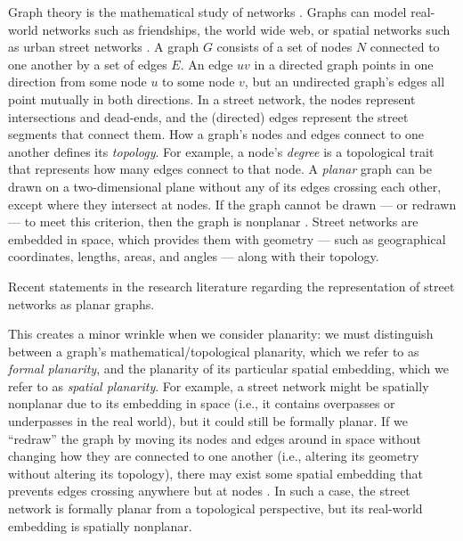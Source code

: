 \documentclass[Afour,sageh,times]{sagej}
\begin{document}
Graph theory is the mathematical study of networks \citep{newman_networks:_2010}. Graphs can model real-world networks such as friendships, the world wide web, or spatial networks such as urban street networks \citep{barthelemy_spatial_2011}. A graph $G$ consists of a set of nodes $N$ connected to one another by a set of edges $E$. An edge $uv$ in a directed graph points in one direction from some node $u$ to some node $v$, but an undirected graph's edges all point mutually in both directions. In a street network, the nodes represent intersections and dead-ends, and the (directed) edges represent the street segments that connect them. How a graph's nodes and edges connect to one another defines its \emph{topology}. For example, a node's \emph{degree} is a topological trait that represents how many edges connect to that node. A \emph{planar} graph can be drawn on a two-dimensional plane without any of its edges crossing each other, except where they intersect at nodes. If the graph cannot be drawn --- or redrawn --- to meet this criterion, then the graph is nonplanar \citep{trudeau_introduction_1994}. Street networks are embedded in space, which provides them with geometry --- such as geographical coordinates, lengths, areas, and angles --- along with their topology.

\begin{table}[htbp]
\centering
\caption{Recent statements in the research literature regarding the representation of street networks as planar graphs.}
\label{tab:planar_quotes}

\end{table}

This creates a minor wrinkle when we consider planarity: we must distinguish between a graph's mathematical/topological planarity, which we refer to as \emph{formal planarity}, and the planarity of its particular spatial embedding, which we refer to as \emph{spatial planarity}. For example, a street network might be spatially nonplanar due to its embedding in space (i.e., it contains overpasses or underpasses in the real world), but it could still be formally planar. If we \enquote{redraw} the graph by moving its nodes and edges around in space without changing how they are connected to one another (i.e., altering its geometry without altering its topology), there may exist some spatial embedding that prevents edges crossing anywhere but at nodes \citep[p.~6]{barthelemy_morphogenesis_2017}. In such a case, the street network is formally planar from a topological perspective, but its real-world embedding is spatially nonplanar.
\end{document}
